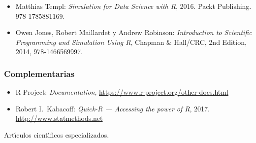 \documentclass[10 pt]{article}
\begin{document}
\begin{itemize}[itemsep=0em]
  
\item{Matthias {\sc Templ}: {\em Simulation for Data Science with R},
    2016. Packt Publishing. 978-1785881169.}
  
\item{Owen {\sc Jones}, Robert {\sc Maillardet} y Andrew {\sc
      Robinson}: {\em Introduction to Scientific Programming and
      Simulation Using R}, Chapman \& Hall/CRC, 2nd Edition, 2014,
    978-1466569997.}
   
\end{itemize}

\subsubsection{Complementarias}

\begin{itemize}[itemsep=0em]
  
\item{{\sc R Project}: {\em Documentation}, \url{https://www.r-project.org/other-docs.html}}
  
\item{Robert I.\ {\sc Kabacoff}: {\em Quick-R --- Accessing the power of R}, 2017. \url{http://www.statmethods.net}}
  
\end{itemize}

Art\'{\i}culos cient\'{\i}ficos especializados.

\label{final} %


\end{document}
